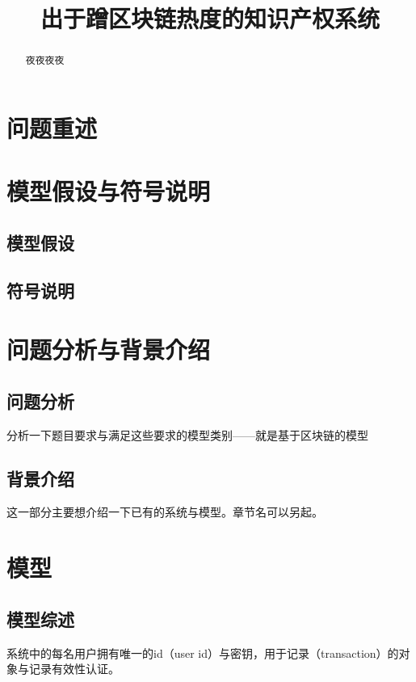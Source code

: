 \documentclass[withoutpreface,bwprint]{cumcmthesis} %
\title{出于蹭区块链热度的知识产权系统}
\begin{document}
 \maketitle
 \begin{abstract}
夜夜夜夜

\end{abstract}

\tableofcontents

\section{问题重述}

\section{模型假设与符号说明}
\subsection{模型假设}
\subsection{符号说明}

\section{问题分析与背景介绍}
\subsection{问题分析}
分析一下题目要求与满足这些要求的模型类别——就是基于区块链的模型
\subsection{背景介绍}
这一部分主要想介绍一下已有的系统与模型。章节名可以另起。

\section{模型}
\subsection{模型综述}

系统中的每名用户拥有唯一的id（user id）与密钥，用于记录（transaction）的对象与记录有效性认证。
\end{document}
